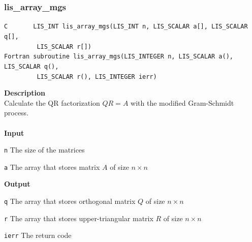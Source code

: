 \documentclass[a4paper]{article}
\newcommand{\namelistlabel}[1]{\mbox{#1}\hfill}
\newenvironment{namelist}[1]{%
\begin{list}{}
  {\let\makelabel\namelistlabel
  \settowidth{\labelwidth}{#1}
  \setlength{\leftmargin}{1.1\labelwidth}}
  }{%
\end{list}}
\begin{document}
\subsubsection{lis\_array\_mgs}
\begin{screen}
\verb|C       LIS_INT lis_array_mgs(LIS_INT n, LIS_SCALAR a[], LIS_SCALAR q[],|\\
\verb|         LIS_SCALAR r[])|\\
\verb|Fortran subroutine lis_array_mgs(LIS_INTEGER n, LIS_SCALAR a(), LIS_SCALAR q(),|\\
\verb|         LIS_SCALAR r(), LIS_INTEGER ierr)|
\end{screen}
{\bf Description}\\
\indent
Calculate the QR factorization $QR=A$ with the modified Gram-Schmidt process.
\\ \\
\noindent
{\bf Input}
\begin{namelist}{XXXXXXXXXXXXXXXXXXXX}
\item[\tt n] The size of the matrices
\item[\tt a] The array that stores matrix $A$ of size $n \times n$
\end{namelist}
{\bf Output}
\begin{namelist}{XXXXXXXXXXXXXXXXXXXX}
\item[\tt q] The array that stores orthogonal matrix $Q$ of size $n \times n$
\item[\tt r] The array that stores upper-triangular matrix $R$ of size $n \times n$  
\item[\tt ierr] The return code
\end{namelist}

\newpage
\end{document}
